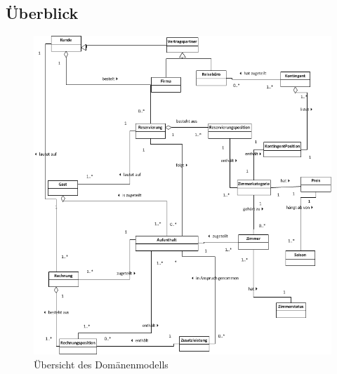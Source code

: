 \documentclass[10pt,a4paper,titlepage]{article}
\begin{document}
\subsection{Überblick}
\begin{figure}[h]
	\includegraphics[width=\linewidth]{Images/Domaenenmodell_Uebersicht.png}
	\caption{Übersicht des Domänenmodells}
\end{figure}
\newpage
\end{document}
